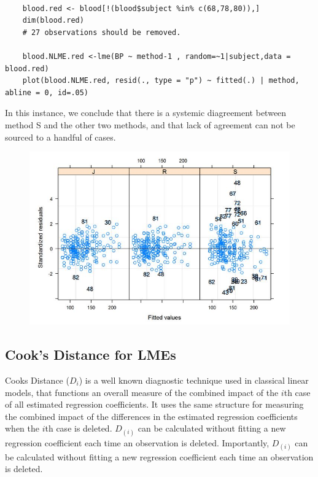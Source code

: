 \documentclass[12pt, a4paper]{report}
\theoremstyle{plain}
\theoremstyle{definition}
\theoremstyle{remark}
\begin{document}
\begin{framed}
	\begin{verbatim}
	
	blood.red <- blood[!(blood$subject %in% c(68,78,80)),]
	dim(blood.red)
	# 27 observations should be removed.
	
	blood.NLME.red <-lme(BP ~ method-1 , random=~1|subject,data = blood.red)
	plot(blood.NLME.red, resid(., type = "p") ~ fitted(.) | method, abline = 0, id=.05)
	\end{verbatim}
\end{framed}

In this instance, we conclude that there is a systemic diagreement between method S and the other two methods, and that lack of agreement can not be sourced to a handful of cases.
\begin{figure}[h!]
	\centering
	\includegraphics[width=0.7\linewidth]{images/bloodnlmeResidPlot2B}
\end{figure}


\newpage





\subsection{Cook's Distance for LMEs} %



 Cooks Distance ($D_{i}$) is a well known diagnostic technique used in classical linear models, that functions an overall measure of the combined impact of the $i$th case of all estimated regression coefficients. It uses the same structure for measuring the combined impact of the differences in the estimated regression coefficients when the $i$th case is deleted. $D_{(i)}$ can be calculated without fitting a new regression coefficient each time an observation is deleted. Importantly, $D_{(i)}$ can be calculated without fitting a new regression coefficient each time an observation is deleted.
\end{document}
